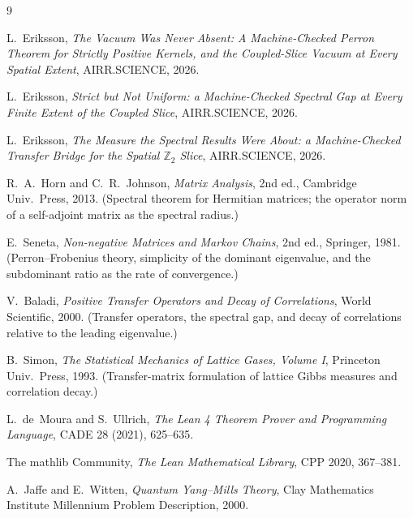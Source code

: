 \documentclass[11pt]{article}
\theoremstyle{definition}
\newcommand{\Z}{\mathbb{Z}}
\begin{document}
\begin{thebibliography}{9}

L.~Eriksson,
\emph{The Vacuum Was Never Absent: A Machine-Checked Perron Theorem for
Strictly Positive Kernels, and the Coupled-Slice Vacuum at Every Spatial
Extent}, AIRR.SCIENCE, 2026.

L.~Eriksson,
\emph{Strict but Not Uniform: a Machine-Checked Spectral Gap at Every Finite
Extent of the Coupled Slice}, AIRR.SCIENCE, 2026.

L.~Eriksson,
\emph{The Measure the Spectral Results Were About: a Machine-Checked Transfer
Bridge for the Spatial $\Z_2$ Slice}, AIRR.SCIENCE, 2026.

R.~A.~Horn and C.~R.~Johnson,
\emph{Matrix Analysis}, 2nd ed., Cambridge Univ.\ Press, 2013.
(Spectral theorem for Hermitian matrices; the operator norm of a self-adjoint
matrix as the spectral radius.)

E.~Seneta,
\emph{Non-negative Matrices and Markov Chains}, 2nd ed., Springer, 1981.
(Perron--Frobenius theory, simplicity of the dominant eigenvalue, and the
subdominant ratio as the rate of convergence.)

V.~Baladi,
\emph{Positive Transfer Operators and Decay of Correlations},
World Scientific, 2000.
(Transfer operators, the spectral gap, and decay of correlations relative to the
leading eigenvalue.)

B.~Simon,
\emph{The Statistical Mechanics of Lattice Gases, Volume I},
Princeton Univ.\ Press, 1993.
(Transfer-matrix formulation of lattice Gibbs measures and correlation decay.)

L.~de~Moura and S.~Ullrich,
\emph{The Lean 4 Theorem Prover and Programming Language},
CADE 28 (2021), 625--635.

The mathlib Community,
\emph{The Lean Mathematical Library},
CPP 2020, 367--381.

A.~Jaffe and E.~Witten,
\emph{Quantum Yang--Mills Theory},
Clay Mathematics Institute Millennium Problem Description, 2000.

\end{thebibliography}
\end{document}
